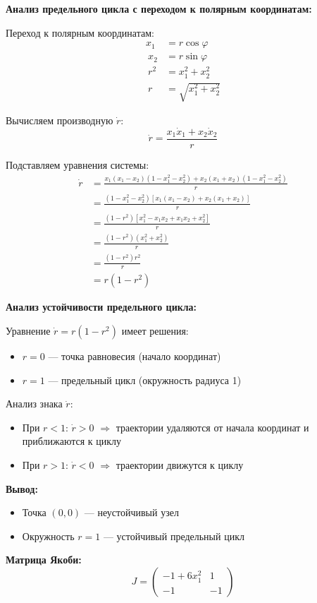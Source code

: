 \textbf{Анализ предельного цикла с переходом к полярным координатам:}

Переход к полярным координатам:
\begin{align}
x_1 &= r\cos\varphi \\\
x_2 &= r\sin\varphi \\\
r^2 &= x_1^2 + x_2^2 \\\
r &= \sqrt{x_1^2 + x_2^2}
\end{align}

Вычисляем производную $\dot{r}$:
$$\dot{r} = \frac{x_1\dot{x}_1 + x_2\dot{x}_2}{r}$$

Подставляем уравнения системы:
\begin{align}
\dot{r} &= \frac{x_1(x_1 - x_2)(1 - x_1^2 - x_2^2) + x_2(x_1 + x_2)(1 - x_1^2 - x_2^2)}{r} \\\
&= \frac{(1 - x_1^2 - x_2^2)[x_1(x_1 - x_2) + x_2(x_1 + x_2)]}{r} \\\
&= \frac{(1 - r^2)[x_1^2 - x_1x_2 + x_1x_2 + x_2^2]}{r} \\\
&= \frac{(1 - r^2)(x_1^2 + x_2^2)}{r} \\\
&= \frac{(1 - r^2)r^2}{r} \\\
&= r(1 - r^2)
\end{align}

\textbf{Анализ устойчивости предельного цикла:}

Уравнение $\dot{r} = r(1 - r^2)$ имеет решения:
\begin{itemize}
\item $r = 0$ --- точка равновесия (начало координат)
\item $r = 1$ --- предельный цикл (окружность радиуса 1)
\end{itemize}

Анализ знака $\dot{r}$:
\begin{itemize}
\item При $r < 1$: $\dot{r} > 0$ $\Rightarrow$ траектории удаляются от начала координат и приближаются к циклу
\item При $r > 1$: $\dot{r} < 0$ $\Rightarrow$ траектории движутся к циклу
\end{itemize}

\textbf{Вывод:}
\begin{itemize}
\item Точка $(0,0)$ --- неустойчивый узел
\item Окружность $r = 1$ --- устойчивый предельный цикл
\end{itemize}

\textbf{Матрица Якоби:}
$$J = \begin{pmatrix} -1 + 6x_1^2 & 1 \\ -1 & -1 \end{pmatrix}$$

